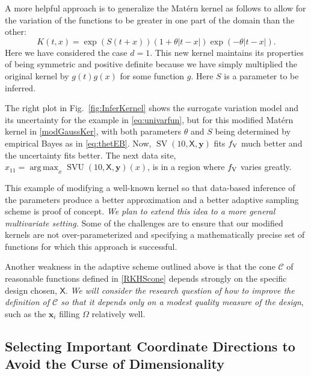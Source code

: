 \documentclass[11pt]{NSFamsart}
\DeclareMathOperator*{\argmax}{arg\,max}
\DeclareMathOperator{\SVAR}{SV} %
\DeclareMathOperator{\SVARERR}{SVU} %
\newcommand{\VAR}{\textup{V}}
\newcommand{\mX}{\mathsf{X}}
\newcommand{\bx}{{\boldsymbol{x}}}
\newcommand{\by}{{\boldsymbol{y}}}
\newcommand{\calc}{{\mathcal{C}}}
\def\abs#1{\ensuremath{\left \lvert #1 \right \rvert}}
\begin{document}
A more helpful approach is to generalize the Mat\'ern kernel as follows to allow for the variation of the functions to be greater in one part of the domain than the other:
\begin{equation} \label{modGaussKer}
K(t,x) = \exp(S(t+x))(1 + \theta \abs{t-x}) \exp(-\theta\abs{t-x}).
\end{equation}
Here we have considered the case $d=1$. This new kernel maintains its properties of being symmetric and positive definite because we have simply multiplied the original kernel by $g(t)g(x)$ for some function $g$. Here $S$ is a parameter to be inferred.

The right plot in Fig.\ \ref{fig:InferKernel} shows the surrogate variation model and its uncertainty for the example in \eqref{eq:univarfun}, but for this modified Mat\'ern kernel in \eqref{modGaussKer}, with both parameters $\theta$ and $S$ being determined by empirical Bayes as in \eqref{eq:thetEB}. Now, $\SVAR(10,\mX,\by)$ fits $f_{\VAR}$ much better and the uncertainty fits better. The next data site, $x_{11} = \argmax_x \SVARERR(10,\mX,\by)(x)$, is in a region where $f_{\VAR}$ varies greatly. 

This example of modifying a well-known kernel so that data-based inference of the parameters produce a better approximation and a better adaptive sampling scheme is proof of concept. \emph{ We plan to extend this idea to a more general multivariate setting.} Some of the challenges are to ensure that our modified kernels are not over-parameterized and specifying a mathematically precise set of functions for which this approach is successful.

Another weakness in the adaptive scheme outlined above is that the cone $\calc$ of reasonable functions defined in \eqref{RKHScone} depends strongly on the specific design chosen, $\mX$. \emph{We will consider the research question of how to improve the definition of $\calc$ so that it depends only on a modest quality measure of the design}, such as the $\bx_i$ filling $\Omega$ relatively well. 

\subsection{Selecting Important Coordinate Directions to Avoid the Curse of Dimensionality} \label{sec:selectCoord}
\end{document}

